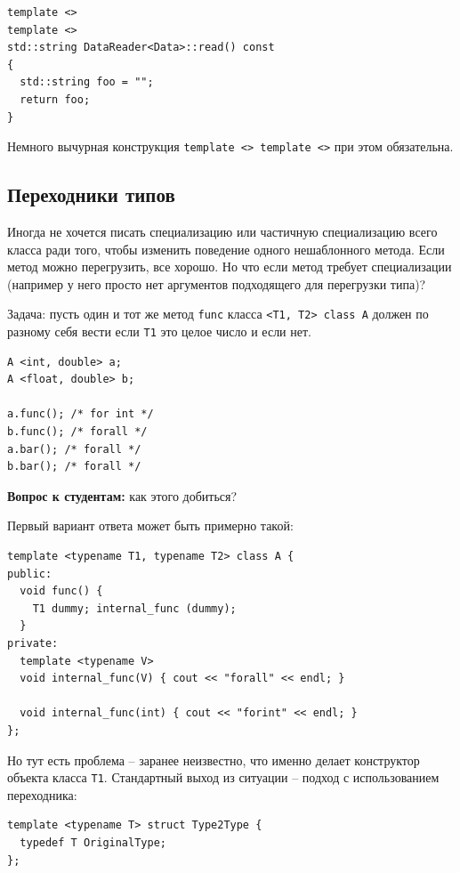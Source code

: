 \documentclass[a4paper,12pt,oneside]{book}
\newif\ifanswers
\begin{document}
\begin{lstlisting}
template <> 
template <> 
std::string DataReader<Data>::read() const
{
  std::string foo = "";
  return foo;
}
\end{lstlisting}

Немного вычурная конструкция \lstinline!template <> template <>! при этом обязательна.

\subsection{Переходники типов}\label{TypeToTypes}

Иногда не хочется писать специализацию или частичную специализацию всего класса ради того, чтобы изменить поведение одного нешаблонного метода. Если метод можно перегрузить, все хорошо. Но что если метод требует специализации (например у него просто нет аргументов подходящего для перегрузки типа)? 

Задача: пусть один и тот же метод \lstinline!func! класса \lstinline!<T1, T2> class A! должен по разному себя вести если \lstinline!T1! это целое число и если нет.

\begin{lstlisting}
A <int, double> a;
A <float, double> b;

a.func(); /* for int */
b.func(); /* forall */
a.bar(); /* forall */
b.bar(); /* forall */
\end{lstlisting}

\textbf{Вопрос к студентам:} как этого добиться?

\ifanswers
См. верный ответ ниже (разумеется предполагается немного подумать самому).
\fi

Первый вариант ответа может быть примерно такой:

\begin{lstlisting}
template <typename T1, typename T2> class A {
public:
  void func() { 
    T1 dummy; internal_func (dummy); 
  }
private:
  template <typename V>
  void internal_func(V) { cout << "forall" << endl; }
  
  void internal_func(int) { cout << "forint" << endl; }
};
\end{lstlisting}

Но тут есть проблема -- заранее неизвестно, что именно делает конструктор объекта класса \lstinline!T1!. Стандартный выход из ситуации -- подход с использованием переходника: 

\begin{lstlisting}
template <typename T> struct Type2Type {
  typedef T OriginalType;
};
\end{lstlisting}
\end{document}
